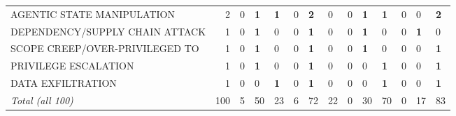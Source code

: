 \begin{table}[htbp]
\begin{tabularx}{\linewidth}{@{} L{2.8cm} r X X X X X X X X X X X X @{}}
AGENTIC STATE MANIPULATION & 2 & 0 & \textbf{1} & \textbf{1} & 0 & \textbf{2} & 0 & 0 & \textbf{1} & \textbf{1} & 0 & 0 & \textbf{2} \\
DEPENDENCY/SUPPLY CHAIN ATTACK & 1 & 0 & \textbf{1} & 0 & 0 & \textbf{1} & 0 & 0 & \textbf{1} & 0 & 0 & \textbf{1} & 0 \\
SCOPE CREEP/OVER-PRIVILEGED TO & 1 & 0 & \textbf{1} & 0 & 0 & \textbf{1} & 0 & 0 & \textbf{1} & 0 & 0 & 0 & \textbf{1} \\
PRIVILEGE ESCALATION & 1 & 0 & \textbf{1} & 0 & 0 & \textbf{1} & 0 & 0 & 0 & \textbf{1} & 0 & 0 & \textbf{1} \\
DATA EXFILTRATION & 1 & 0 & 0 & \textbf{1} & 0 & \textbf{1} & 0 & 0 & 0 & \textbf{1} & 0 & 0 & \textbf{1} \\
\midrule
\textit{Total (all 100)} & 100 & 5 & 50 & 23 & 6 & 72 & 22 & 0 & 30 & 70 & 0 & 17 & 83 \\
\bottomrule
\end{tabularx}
\end{table}

